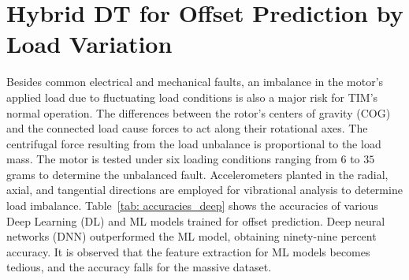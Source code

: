 \documentclass[a4paper,conference]{IEEEtran}
\begin{document}
\begin{table}[b!]
\centering
\caption{COMPARISON OF ACCURACY(ACC) FOR FAULT LOCALIZATION USING ML CLASSIFIERS.}
\label{tab: accuracies}
\end{table}








\section{Hybrid DT for Offset Prediction by Load Variation}\label{sec:OffsetPrediciton} 
Besides common electrical and mechanical faults, an imbalance in the motor's applied load due to fluctuating load conditions is also a major risk for TIM’s normal operation. The differences between the rotor's centers of gravity (COG) and the connected load cause forces to act along their rotational axes. The centrifugal force resulting from the load unbalance is proportional to the load mass. The motor is tested under six loading conditions ranging from $6$ to $35$ grams to determine the unbalanced fault. Accelerometers planted in the radial, axial, and tangential directions are employed for vibrational analysis to determine load imbalance. Table~\ref{tab: accuracies_deep} shows the accuracies of various Deep Learning (DL) and ML models trained for offset prediction. Deep neural networks (DNN) outperformed the ML model, obtaining ninety-nine percent accuracy. It is observed that the feature extraction for ML models becomes tedious, and the accuracy falls for the massive dataset.
\end{document}

